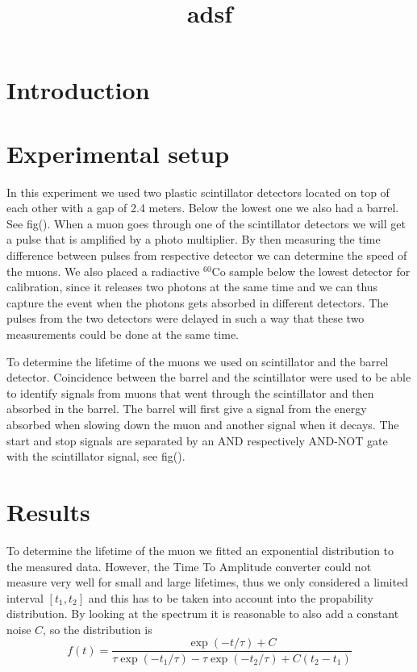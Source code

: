 \documentclass[12pt,twocolumn]{article}
\title{adsf}
\author{}
\begin{document}
\tableofcontents
\renewcommand{\abstractname}{Abstract}
\begin{abstract}
\end{abstract}
\section{Introduction}

\section{Experimental setup}
In this experiment we used two plastic scintillator detectors located on top of each other with a gap of 2.4 meters. Below the lowest one we also had a barrel. See fig(). When a muon goes through one of the scintillator detectors we will get a pulse that is amplified by a photo multiplier. By then measuring the time difference between pulses from respective detector we can determine the speed of the muons. We also placed a radiactive $^{60}$Co sample below the lowest detector for calibration, since it releases two photons at the same time and we can thus capture the event when the photons gets absorbed in different detectors. The pulses from the two detectors were delayed in such a way that these two measurements could be done at the same time.\newline

To determine the lifetime of the muons we used on scintillator and the barrel detector. Coincidence between the barrel and the scintillator were used to be able to identify signals from muons that went through the scintillator and then absorbed in the barrel. The barrel will first give a signal from the energy absorbed when slowing down the muon and another signal when it decays. The start and stop signals are separated by an AND respectively AND-NOT gate with the scintillator signal, see fig().



\section{Results}
To determine the lifetime of the muon we fitted an exponential distribution to the measured data. However, the Time To Amplitude converter could not measure very well for small and large lifetimes, thus we only considered a limited interval $[t_1,t_2]$ and this has to be taken into account into the propability distribution. By looking at the spectrum it is reasonable to also add a constant noise $C$, so the distribution is
\begin{equation}
f(t)=\frac{\exp{(-t/\tau)}+C}{\tau\exp{(-t_1/\tau)}-\tau\exp{(-t_2/\tau)}+C(t_2-t_1)}\label{pdf}
\end{equation}
\end{document}
